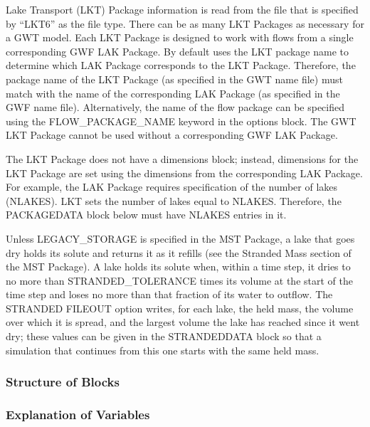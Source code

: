 Lake Transport (LKT) Package information is read from the file that is specified by ``LKT6'' as the file type.  There can be as many LKT Packages as necessary for a GWT model. Each LKT Package is designed to work with flows from a single corresponding GWF LAK Package. By default \mf uses the LKT package name to determine which LAK Package corresponds to the LKT Package.  Therefore, the package name of the LKT Package (as specified in the GWT name file) must match with the name of the corresponding LAK Package (as specified in the GWF name file).  Alternatively, the name of the flow package can be specified using the FLOW\_PACKAGE\_NAME keyword in the options block.  The GWT LKT Package cannot be used without a corresponding GWF LAK Package.

The LKT Package does not have a dimensions block; instead, dimensions for the LKT Package are set using the dimensions from the corresponding LAK Package.  For example, the LAK Package requires specification of the number of lakes (NLAKES).  LKT sets the number of lakes equal to NLAKES.  Therefore, the PACKAGEDATA block below must have NLAKES entries in it.

Unless LEGACY\_STORAGE is specified in the MST Package, a lake that goes dry holds its solute and returns it as it refills (see the Stranded Mass section of the MST Package).  A lake holds its solute when, within a time step, it dries to no more than STRANDED\_TOLERANCE times its volume at the start of the time step and loses no more than that fraction of its water to outflow.  The STRANDED FILEOUT option writes, for each lake, the held mass, the volume over which it is spread, and the largest volume the lake has reached since it went dry; these values can be given in the STRANDEDDATA block so that a simulation that continues from this one starts with the same held mass.

\vspace{5mm}
\subsubsection{Structure of Blocks}





\vspace{5mm}
\subsubsection{Explanation of Variables}
\begin{description}

\end{description}

